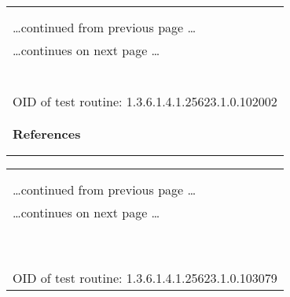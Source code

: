 \documentclass{article}
\begin{document}
\begin{longtable}{|p{}|}
\hline
\rowcolor{openvas_log}{\color{white}{Log (CVSS: 0.0) }}\\
\rowcolor{openvas_log}{\color{white}{NVT: OS fingerprinting}}\\
\hline
\endfirsthead
\hfill\ldots continued from previous page \ldots \\
\hline
\endhead
\hline
\ldots continues on next page \ldots \\
\endfoot
\hline
\endlastfoot
\\
\rowcolor{white}{\verb=ICMP based OS fingerprint results: (100% confidence)=}\\
\rowcolor{white}{\verb=Linux Kernel=}\\
\rowcolor{white}{\verb==}\\
\rowcolor{white}{\verb==}\\
\\
OID of test routine: 1.3.6.1.4.1.25623.1.0.102002\\
\\

      \hline
      \\
\textbf{References}\\
\rowcolor{white}{\verb=Other:=}\\
\rowcolor{white}{\verb=  URL:http://www.phrack.org/issues.html?issue=\verb-=-\verb=57&amp;id=\verb-=-\verb=7#article=}\\
\end{longtable}

\begin{longtable}{|p{}|}
\hline
\rowcolor{openvas_log}{\color{white}{Log (CVSS: 0.0) }}\\
\rowcolor{openvas_log}{\color{white}{NVT: DIRB (NASL wrapper)}}\\
\hline
\endfirsthead
\hfill\ldots continued from previous page \ldots \\
\hline
\endhead
\hline
\ldots continues on next page \ldots \\
\endfoot
\hline
\endlastfoot
\\
\rowcolor{white}{\verb=DIRB could not be found in your system path.=}\\
\rowcolor{white}{\verb=OpenVAS was unable to execute DIRB and to perform the scan you=}\\
\rowcolor{white}{\verb=requested.=}\\
\rowcolor{white}{\verb=Please make sure that DIRB is installed and is=}\\
\rowcolor{white}{\verb=available in the PATH variable defined for your environment.=}\\
\rowcolor{white}{\verb==}\\
\rowcolor{white}{\verb==}\\
\\
OID of test routine: 1.3.6.1.4.1.25623.1.0.103079\\
\end{longtable}
\end{document}
